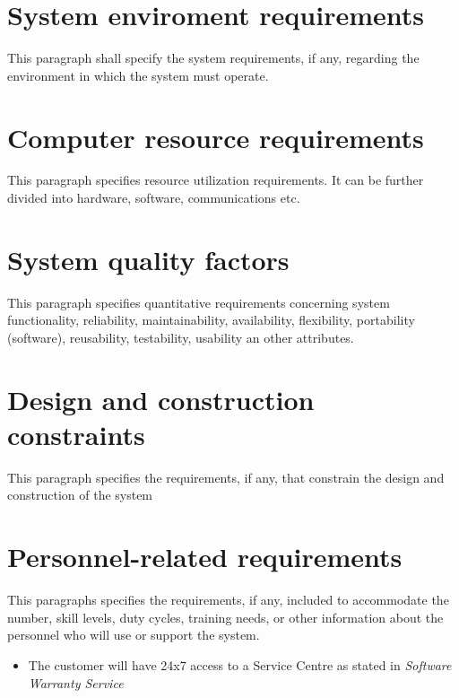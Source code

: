 \section{System enviroment requirements}
This paragraph shall specify the system requirements, if any, regarding the environment in which the system must operate.


\section{Computer resource requirements}
This paragraph specifies resource utilization requirements. It can be further divided into hardware, software, communications etc.



\section{System quality factors}
This paragraph specifies quantitative requirements concerning system functionality, reliability, maintainability, availability, flexibility, portability (software), reusability, testability, usability an other attributes.



\section{Design and construction constraints}
This paragraph specifies the requirements, if any, that constrain the design and construction of the system



\section{Personnel-related requirements}
This paragraphs specifies the requirements, if any, included to accommodate the number, skill levels, duty cycles, training needs, or other information about the personnel who will use or support the system.

\begin{itemize}
	\item The customer will have 24x7 access to a Service Centre as stated in \emph{Software Warranty Service}
\end{itemize}


